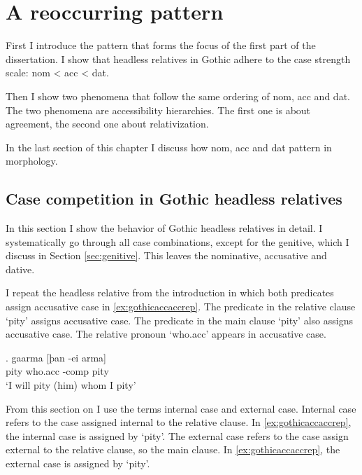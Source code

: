 
\chapter{A reoccurring pattern}

First I introduce the pattern that forms the focus of the first part of the dissertation. I show that headless relatives in Gothic adhere to the case strength scale: \ac{nom} < \ac{acc} < \ac{dat}.

Then I show two phenomena that follow the same ordering of \ac{nom}, \ac{acc} and \ac{dat}. The two phenomena are accessibility hierarchies. The first one is about agreement, the second one about relativization.

In the last section of this chapter I discuss how \ac{nom}, \ac{acc} and \ac{dat} pattern in morphology.


\section{Case competition in Gothic headless relatives}

In this section I show the behavior of Gothic headless relatives in detail. I systematically go through all case combinations, except for the genitive, which I discuss in Section \ref{sec:genitive}. This leaves the nominative, accusative and dative.

I repeat the headless relative from the introduction in which both predicates assign accusative case in \ref{ex:gothicaccaccrep}. The predicate in the relative clause  `pity' assigns accusative case. The predicate in the main clause  `pity' also assigns accusative case. The relative pronoun  `who.\ac{acc}' appears in accusative case.

\exg. gaarma [þan -ei arma]\\
 pity\scsub{[acc]} who.\ac{acc} -\ac{comp} pity\scsub{[acc]}\\
 `I will pity (him) whom I pity' \label{ex:gothicaccaccrep}

From this section on I use the terms internal case and external case. Internal case refers to the case assigned internal to the relative clause. In \ref{ex:gothicaccaccrep}, the internal case is assigned by  `pity'. The external case refers to the case assign external to the relative clause, so the main clause. In \ref{ex:gothicaccaccrep}, the external case is assigned by  `pity'.


